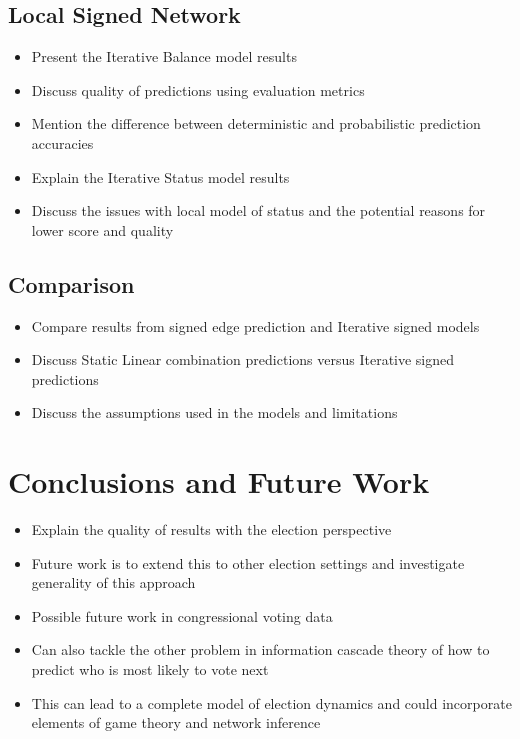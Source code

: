 \section{Local Signed Network}
\begin{itemize}
    \item Present the Iterative Balance model results
    \item Discuss quality of predictions using evaluation metrics
    \item Mention the difference between deterministic and probabilistic prediction accuracies
    \item Explain the Iterative Status model results 
    \item Discuss the issues with local model of status and the potential reasons for lower score and quality
\end{itemize}
\section{Comparison}
\begin{itemize}
    \item Compare results from signed edge prediction and Iterative signed models
    \item Discuss Static Linear combination predictions versus Iterative signed predictions 
    \item Discuss the assumptions used in the models and limitations 
\end{itemize}

\chapter{Conclusions and Future Work}
\begin{itemize}
    \item Explain the quality of results with the election perspective
    \item Future work is to extend this to other election settings and investigate generality of this approach
    \item Possible future work in congressional voting data
    \item Can also tackle the other problem in information cascade theory of how to predict who is most likely to vote next 
    \item This can lead to a complete model of election dynamics and could incorporate elements of game theory and network inference 
\end{itemize}
